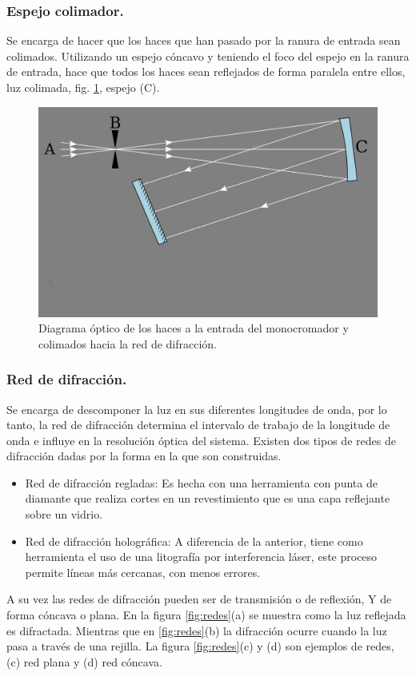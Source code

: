 \subsubsection{Espejo colimador.}
Se encarga de hacer que los haces que han pasado por la ranura de entrada sean colimados. Utilizando un espejo cóncavo y teniendo el foco del espejo en la ranura de entrada, hace que todos los haces sean reflejados de forma paralela entre ellos, luz colimada, fig. \ref{fig:colimarluz}, espejo (C). 

\begin{figure}[h]
	\centering
	\includegraphics[width=0.6\linewidth]{Imagenes/ColimarLuz}
	\caption{Diagrama óptico de los haces a la entrada del monocromador y colimados hacia la red de difracción. \cite{Czerny-Turney-Conf}}
	\label{fig:colimarluz}
\end{figure}

\subsubsection{Red de difracción.}
Se encarga de descomponer la luz en sus diferentes longitudes de onda, por lo tanto, la red de difracción determina el intervalo de trabajo de la longitude de onda e influye en la resolución óptica del sistema. 
Existen dos tipos de redes de difracción dadas por la forma en la que son construidas.
\begin{itemize}
	\item Red de difracción regladas: Es hecha con una herramienta con punta de diamante que realiza cortes en un revestimiento que es una capa reflejante sobre un vidrio.
	\item Red de difracción holográfica: A diferencia de la anterior, tiene como herramienta el uso de una litografía por interferencia láser, este proceso permite líneas más cercanas, con menos errores.
\end{itemize}

A su vez las redes de difracción pueden ser de transmisión o de reflexión, Y de forma cóncava o plana. En la figura \ref{fig:redes}(a) se muestra como la luz reflejada es difractada. Mientras que en \ref{fig:redes}(b) la difracción ocurre cuando la luz pasa a través de una rejilla. La figura \ref{fig:redes}(c) y (d) son ejemplos de redes, (c) red plana y (d) red cóncava.

